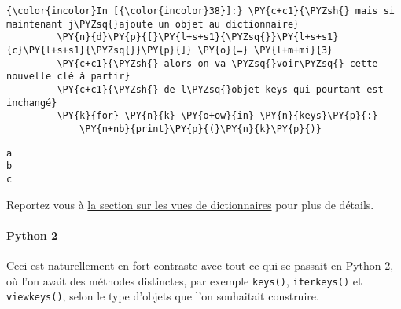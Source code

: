     \begin{Verbatim}[commandchars=\\\{\}]
{\color{incolor}In [{\color{incolor}38}]:} \PY{c+c1}{\PYZsh{} mais si maintenant j\PYZsq{}ajoute un objet au dictionnaire}
         \PY{n}{d}\PY{p}{[}\PY{l+s+s1}{\PYZsq{}}\PY{l+s+s1}{c}\PY{l+s+s1}{\PYZsq{}}\PY{p}{]} \PY{o}{=} \PY{l+m+mi}{3}
         \PY{c+c1}{\PYZsh{} alors on va \PYZsq{}voir\PYZsq{} cette nouvelle clé à partir}
         \PY{c+c1}{\PYZsh{} de l\PYZsq{}objet keys qui pourtant est inchangé}
         \PY{k}{for} \PY{n}{k} \PY{o+ow}{in} \PY{n}{keys}\PY{p}{:}
             \PY{n+nb}{print}\PY{p}{(}\PY{n}{k}\PY{p}{)}
\end{Verbatim}


    \begin{Verbatim}[commandchars=\\\{\}]
a
b
c

    \end{Verbatim}

    Reportez vous à
\href{https://docs.python.org/3/library/stdtypes.html\#dictionary-view-objects}{la
section sur les vues de dictionnaires} pour plus de détails.

    \hypertarget{python-2}{%
\paragraph{Python 2}\label{python-2}}

    Ceci est naturellement en fort contraste avec tout ce qui se passait en
Python 2, où l'on avait des méthodes distinctes, par exemple
\texttt{keys()}, \texttt{iterkeys()} et \texttt{viewkeys()}, selon le
type d'objets que l'on souhaitait construire.